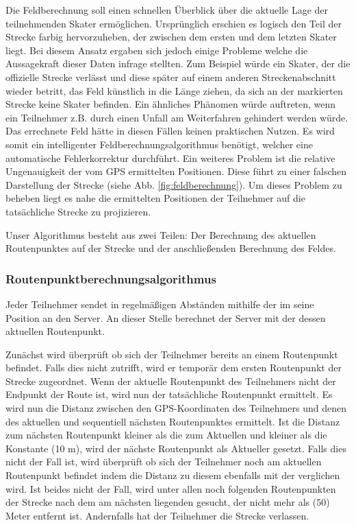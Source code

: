 Die Feldberechnung soll einen schnellen Überblick über die aktuelle Lage der teilnehmenden Skater ermöglichen. Ursprünglich erschien es logisch den Teil der Strecke farbig hervorzuheben, der zwischen dem ersten und dem letzten Skater liegt. Bei diesem Ansatz ergaben sich jedoch einige Probleme welche die Aussagekraft dieser Daten infrage stellten. Zum Beispiel würde ein Skater, der die offizielle Strecke verlässt und diese später auf einem anderen Streckenabschnitt wieder betritt, das Feld künstlich in die Länge ziehen, da sich an der markierten Strecke keine Skater befinden. Ein ähnliches Phänomen würde auftreten, wenn ein Teilnehmer z.B. durch einen Unfall am Weiterfahren gehindert werden würde. Das errechnete Feld hätte in diesen Fällen keinen praktischen Nutzen. Es wird somit ein intelligenter Feldberechnungsalgorithmus benötigt, welcher eine automatische Fehlerkorrektur durchführt. Ein weiteres Problem ist die relative Ungenauigkeit der vom GPS ermittelten Positionen. Diese führt zu einer falschen Darstellung der Strecke (siehe Abb. \ref{fig:feldberechnung}). Um dieses Problem zu beheben liegt es nahe die ermittelten Positionen der Teilnehmer auf die tatsächliche Strecke zu projizieren.

Unser Algorithmus besteht aus zwei Teilen: Der Berechnung des aktuellen Routenpunktes auf der Strecke und der anschließenden Berechnung des Feldes.

\subsubsection{Routenpunktberechnungsalgorithmus}
\label{subsubsec:Routenpunktberechnungsalgorithmus}
Jeder Teilnehmer sendet in regelmäßigen Abständen mithilfe der  im  seine Position an den Server. An dieser Stelle berechnet der Server mit der  dessen aktuellen Routenpunkt.

Zunächst wird überprüft ob sich der Teilnehmer bereits an einem Routenpunkt befindet. Falls dies nicht zutrifft, wird er temporär dem ersten Routenpunkt der Strecke zugeordnet. Wenn der aktuelle Routenpunkt des Teilnehmers nicht der Endpunkt der Route ist, wird nun der tatsächliche Routenpunkt ermittelt. Es wird nun die Distanz zwischen den GPS-Koordinaten des Teilnehmers und denen des aktuellen und sequentiell nächsten Routenpunktes ermittelt. Ist die Distanz zum nächsten Routenpunkt kleiner als die zum Aktuellen und kleiner als die Konstante  (10 m), wird der nächste Routenpunkt als Aktueller gesetzt. Falls dies nicht der Fall ist, wird überprüft ob sich der Teilnehmer noch am aktuellen Routenpunkt befindet indem die Distanz zu diesem ebenfalls mit der  verglichen wird. Ist beides nicht der Fall, wird unter allen noch folgenden Routenpunkten der Strecke nach dem am nächsten liegenden gesucht, der nicht mehr als  (50) Meter entfernt ist. Andernfalls hat der Teilnehmer die Strecke verlassen.

